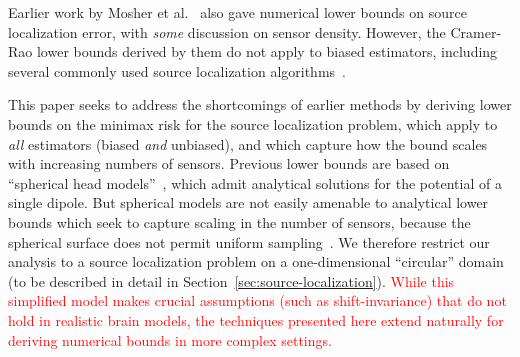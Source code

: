 \documentclass[conference,letterpaper]{IEEEtran}
\begin{document}

Earlier work by Mosher et al.~\cite{Mosher1993Error} also gave numerical lower
bounds on source localization error, with \emph{some} discussion on sensor
density. However, the Cramer-Rao lower bounds derived by them do not apply to
biased estimators, including several commonly used source localization
algorithms~\cite{Hamalainen1994Interpreting,Lin2006Assessing}.

This paper seeks to address the shortcomings of earlier methods by deriving
lower bounds on the minimax risk for the source localization problem, which
apply to \emph{all} estimators (biased \emph{and} unbiased), and which capture
how the bound scales with increasing numbers of sensors. Previous lower bounds
are based on ``spherical head
models''~\cite{Nunez2006Electric,Grover2016Information}, which admit analytical
solutions for the potential of a single dipole. But spherical models are not
easily amenable to analytical lower bounds which seek to capture scaling in the
number of sensors, because the spherical surface does not permit uniform
sampling~\cite{Heath1956Thirteen}. We therefore restrict our analysis to a
source localization problem on a one-dimensional ``circular'' domain (to be
described in detail in Section~\ref{sec:source-localization}). \textcolor{red}{While this
simplified model makes crucial assumptions (such as shift-invariance) that do
not hold in realistic brain models, the techniques presented here extend
naturally for deriving numerical bounds in more complex settings.}
\end{document}
